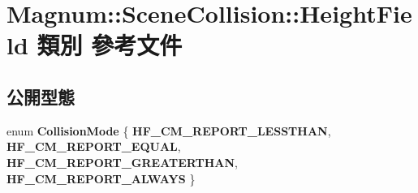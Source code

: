 \hypertarget{class_magnum_1_1_scene_collision_1_1_height_field}{}\section{Magnum\+:\+:Scene\+Collision\+:\+:Height\+Field 類別 參考文件}
\label{class_magnum_1_1_scene_collision_1_1_height_field}
\subsection*{公開型態}
\begin{DoxyCompactItemize}
\item 
enum {\bfseries Collision\+Mode} \{ {\bfseries H\+F\+\_\+\+C\+M\+\_\+\+R\+E\+P\+O\+R\+T\+\_\+\+L\+E\+S\+S\+T\+H\+AN}, 
{\bfseries H\+F\+\_\+\+C\+M\+\_\+\+R\+E\+P\+O\+R\+T\+\_\+\+E\+Q\+U\+AL}, 
{\bfseries H\+F\+\_\+\+C\+M\+\_\+\+R\+E\+P\+O\+R\+T\+\_\+\+G\+R\+E\+A\+T\+E\+R\+T\+H\+AN}, 
{\bfseries H\+F\+\_\+\+C\+M\+\_\+\+R\+E\+P\+O\+R\+T\+\_\+\+A\+L\+W\+A\+YS}
 \}\hypertarget{class_magnum_1_1_scene_collision_1_1_height_field_a8d4e8992b522b4bd4152a4bbd5d9af35}{}\label{class_magnum_1_1_scene_collision_1_1_height_field_a8d4e8992b522b4bd4152a4bbd5d9af35}

\end{DoxyCompactItemize}
